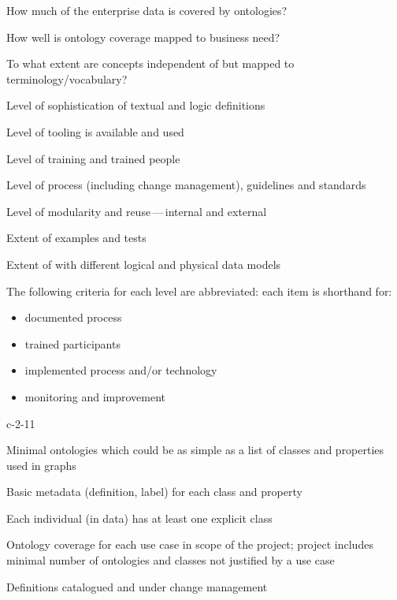 \begin{maturity-dimensions}

    \item How much of the enterprise data is covered by ontologies?
    \item How well is ontology coverage mapped to business need?
    \item To what extent are concepts independent of but mapped to terminology/vocabulary?
    \item Level of sophistication of textual and logic definitions
    \item Level of tooling is available and used
    \item Level of training and trained people
    \item Level of process (including change management), guidelines and standards
    \item Level of modularity and reuse\,---\,internal and external
    \item Extent of examples and tests
    \item Extent of  with different logical and physical data models
    
\end{maturity-dimensions}

\ekgmmCapabilitySectionLevels

The following criteria for each level are abbreviated: each item is shorthand for:

\begin{itemize}
    \item documented process
    \item trained participants
    \item implemented process and/or technology
    \item monitoring and improvement
\end{itemize}

\ekgmmCapabilitySectionLevelsOneFive

\begin{level-assessment}{c-2-1}{1}

    \item Minimal ontologies which could be as simple as a list of classes and properties used in graphs
    \item Basic metadata (definition, label) for each class and property
    \item Each individual (in data) has at least one explicit class
    \item Ontology coverage for each use case in scope of the project;
          project includes minimal number of ontologies and classes not justified by a use case
    \item Definitions catalogued and under change management

\end{level-assessment}

